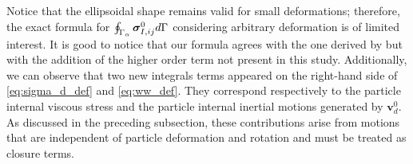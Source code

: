 Notice that the ellipsoidal shape remains valid for small deformations; therefore, the exact formula for $\oint_{\Gamma_{\alpha}} \bm\sigma_{I,ij}^0 d\Gamma$ considering arbitrary deformation is of limited interest. 
It is good to notice that our formula agrees with the one derived by \citet{lhuillier1987phenomenology} but with the addition of the higher order term not present in this study. 
Additionally, we can observe that two new integrals terms appeared on the right-hand side of \ref{eq:sigma_d_def}  and \ref{eq:ww_def}. 
They correspond respectively to the particle internal viscous stress and the particle internal inertial motions generated by $\textbf{v}_d^0$.
As discussed in the preceding subsection, these contributions arise from motions that are independent of particle deformation and rotation and must be treated as closure terms. 



